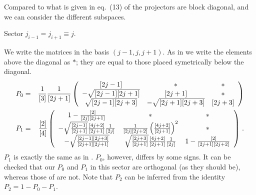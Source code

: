 \documentclass[11pt]{article}
\begin{document}
Compared to what is given in eq.~(13) of \cite{Vincent} the projectors are block diagonal, and we can consider the different subspaces. 

\begin{paragraph}{Sector $j_{i-1} = j_{i+1} \equiv j$.}

We write the matrices in the basis $(j-1 , j , j+1)$.
As in \cite{Vincent} we write the elements above the diagonal as $*$; they are equal to those placed symetrically below the diagonal.
%
\begin{eqnarray}
 P_0 &=& \frac{1}{[3]}\frac{1}{[2j+1]}\left(
 \begin{array}{ccc}
[2j-1] &  * & * \\
  -\sqrt{[2j-1][2j+1]} & [2j+1] & *\\
  \sqrt{[2j-1][2j+3]} &-\sqrt{[2j+1][2j+3]} &  [2j+3] \\
 \end{array}
 \right)
 \\ 
  P_1 &=& \frac{[2]}{[4]}\left(
 \begin{array}{ccc}
1- \frac{[2]}{[2j][2j+1]} &  * & * \\
  -\sqrt{[2j-1]\over [2j+1]}\frac{[4j+2]}{[2j+1]}\frac{1}{[2j]} & \frac{1}{[2j][2j+2]}\left(\frac{[4j+2]}{[2j+1]}\right)^2  & *\\
  -\sqrt{[2j-1][2j+3] \over [2j+1][2j+1]} & \sqrt{[2j+3] \over [2j+1]}\frac{[4j+2]}{[2j+1]}\frac{1}{[2j]} &  1- \frac{[2]}{[2j+1][2j+2]} \\
 \end{array}
 \right) \,.
 \label{P0P1matrix}
\end{eqnarray}
%
$P_1$ is exactly the same as in \cite{Vincent}. $P_0$, however, differs by some signs. 
It can be checked that our $P_0$ and $P_1$ in this sector are orthogonal (as they should be), whereas those of \cite{Vincent} are not. 
Note that $P_2$ can be inferred from the identity $P_2 = 1 - P_0 - P_1$.
\end{paragraph}
\end{document}
